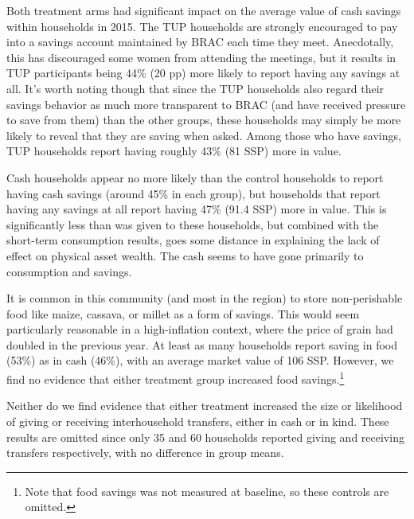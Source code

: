 \documentclass[12pt,article]{article}
\begin{document}
Both treatment arms had significant impact on the average value of cash savings
within households in 2015. The TUP households are strongly encouraged to pay into a savings
account maintained by BRAC each time they meet. Anecdotally, this has discouraged
some women from attending the meetings, but it results in TUP participants being 44\%
(20 pp) more likely to report having any savings at all. It's
worth noting though that since the TUP households also regard their savings behavior
as much more transparent to BRAC (and have received pressure to save from them) than
the other groups, these households may simply be more likely to reveal that they are
saving when asked. Among those who have savings, TUP households report having roughly
43\% (81 SSP) more in value.

Cash households appear no more likely than the control households to report having
cash savings (around 45\% in each group), but households that report having any
savings at all report
having 47\% (91.4 SSP) more in value. This is significantly less than was given to
these households, but combined with the short-term consumption results, goes some
distance in explaining the lack of effect on physical asset wealth. The cash seems to
have gone primarily to consumption and savings.

It is common in this community (and most in the region) to store non-perishable food
like maize, cassava, or millet as a form of savings. This would seem particularly
reasonable in a high-inflation context, where the price of grain had doubled in the
previous year. At least as many households report saving in food (53\%) as in cash
(46\%), with an average market value of 106 SSP. However, we find no evidence that
either treatment group increased food savings.\footnote{Note that food savings was not
measured at baseline, so these controls are omitted.}

Neither do we find evidence that either treatment increased the size or likelihood of
giving or receiving interhousehold transfers, either in cash or in kind. These
results are omitted since only 35 and 60 households reported giving and receiving
transfers respectively, with no difference in group means.
\end{document}
